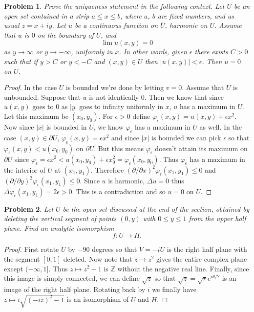 \documentclass{article}
\newtheorem{problem}{Problem}
\begin{document}
\begin{problem}
Prove the uniqueness statement in the following context. Let $U$ be an open set contained in a strip $a \leq x \leq b$, where $a$, $b$ are fixed numbers, and as usual $z = x+iy$. Let $u$ be a continuous function on $\overline{U}$, harmonic on $U$. Assume that $u$ is $0$ on the boundary of $U$, and
\[
\lim u(x,y) = 0
\]
as $y \rightarrow \infty$ or $y \rightarrow - \infty$, uniformly in $x$. In other words, given $\epsilon$ there exists $C > 0$ such that if $y > C$ or $y < -C$ and $(x,y) \in U$ then $|u(x,y)| < \epsilon$. Then $u = 0$ on $U$.
\end{problem}
\begin{proof}
In the case $U$ is bounded we're done by letting $v = 0$. Assume that $U$ is unbounded. Suppose that $u$ is not identically $0$. Then we know that since $u(x,y)$ goes to $0$ as $|y|$ goes to infinity uniformly in $x$, $u$ has a maximum in $U$. Let this maximum be $(x_0, y_0)$. For $\epsilon > 0$ define $\varphi_{\epsilon} (x,y) = u(x,y) + \epsilon x^2$. Now since $|x|$ is bounded in $U$, we know $\varphi_{\epsilon}$ has a maximum in $U$ as well. In the case $(x,y) \in \partial U$, $\varphi_{\epsilon}(x,y) = \epsilon x^2$ and since $|x|$ is bounded we can pick $\epsilon$ so that $\varphi_{\epsilon}(x,y) < u(x_0, y_0)$ on $\partial U$. But this means $\varphi_{\epsilon}$ doesn't attain its maximum on $\partial U$ since $\varphi_{\epsilon} = \epsilon x^2 < u(x_0, y_0) + \epsilon x_0^2 = \varphi_{\epsilon} (x_0, y_0)$. Thus $\varphi_{\epsilon}$ has a maximum in the interior of $U$ at $(x_1, y_1)$. Therefore $(\partial/\partial x)^2 \varphi_{\epsilon} (x_1, y_1) \leq 0$ and $(\partial/\partial y)^2 \varphi_{\epsilon} (x_1, y_1) \leq 0$. Since $u$ is harmonic, $\Delta u = 0$ thus $\Delta \varphi_{\epsilon}(x_1, y_1) = 2 \epsilon > 0$. This is a contradiction and so $u = 0$ on $U$.
\end{proof}

\begin{problem}
Let $U$ be the open set discussed at the end of the section, obtained by deleting the vertical segment of points $(0,y)$ with $0 \leq y \leq 1$ from the upper half plane. Find an analytic isomorphism
\[
f : U \to H.
\]
\end{problem}
\begin{proof}
First rotate $U$ by $-90$ degrees so that $V = -iU$ is the right half plane with the segment $[0,1]$ deleted. Now note that $z \mapsto z^2$ gives the entire complex plane except $(-\infty, 1]$. Thus $z \mapsto z^2 - 1$ is $\mathbb{Z}$ without the negative real line. Finally, since this image is simply connected, we can define $\sqrt{z}$ so that $\sqrt{z} = \sqrt{r}e^{i \theta/2}$ is an image of the right half plane. Rotating back by $i$ we finally have $z \mapsto i\sqrt{(-iz)^2-1}$ is an isomorphism of $U$ and $H$.
\end{proof}
\end{document}
